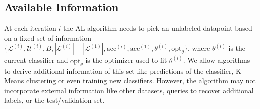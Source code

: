 \documentclass[]{article}
\begin{document}
\subsection{Available Information}
At each iteration $i$ the AL algorithm needs to pick an unlabeled datapoint based on a fixed set of information $\{\mathcal{L}^{(i)}, \mathcal{U}^{(i)}, B, |\mathcal{L}^{(i)}|-|\mathcal{L}^{(1)}|, \text{acc}^{(i)}, \text{acc}^{(1)}, \theta^{(i)}, \text{opt}_\theta\}$, where $\theta^{(i)}$ is the current classifier and $\text{opt}_\theta$ is the optimizer used to fit $\theta^{(i)}$.
We allow algorithms to derive additional information of this set like predictions of the classifier, K-Means clustering or even training new classifiers.
However, the algorithm may not incorporate external information like other datasets, queries to recover additional labels, or the test/validation set.

\end{document}
